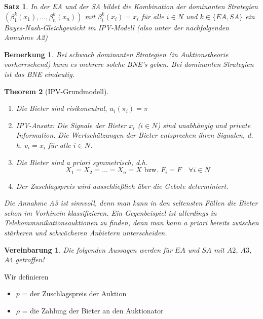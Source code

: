 \documentclass[12pt]{extreport} %
\theoremstyle{named}
\newtheorem{unnamedtheorem}{Theorem} \counterwithin{unnamedtheorem}{chapter}
\theoremstyle{nnamed}
\theoremstyle{itshape}
\newtheorem{satz}[unnamedtheorem]{Satz}
\theoremstyle{normal}
\newtheorem*{bemerkung}{Bemerkung}
\newtheorem*{vereinbarung}{Vereinbarung}
\begin{document}
\begin{satz}
	In der EA und der SA bildet die Kombination der dominanten Strategien $\left(\beta_{1}^{k}(x_{1}), \dotsc, \beta_{n}^{k}(x_{n}) \right)$ mit $\beta_{i}^{k}(x_{i}) = x_{i}$ für alle $i \in N$ und $k \in \{ EA, SA \}$ ein Bayes-Nash-Gleichgewicht im IPV-Modell (also unter der nachfolgenden Annahme A2)
\end{satz}

\begin{bemerkung}
	Bei schwach dominanten Strategien (in Auktionstheorie vorherrschend) kann es mehrere solche BNE's geben. Bei dominanten Strategien ist das BNE eindeutig.	
\end{bemerkung}

  
\begin{unnamedtheorem}[IPV-Grundmodell] ~\
	\begin{enumerate}
		\item[\hspace{0.5cm}A1:] Die Bieter sind risikoneutral, $u_{i}(\pi_{i}) = \pi$
		\item[\hspace{0.5cm}A2:] IPV-Ansatz: Die Signale der Bieter $x_i$ ($i \in N$) sind unabhängig und private Information. Die Wertschätzungen der Bieter entsprechen ihren Signalen, d. h. $v_i = x_i$ für alle $i \in N$.
		\item[\hspace{0.5cm}A3:] Die Bieter sind a priori symmetrisch, d.h.$$ X_{1} = X_{2} = \dotsc = X_{n} = X \text{ bzw. } F_{i} = F \quad \forall i \in N $$
		\item[\hspace{0.5cm}A4:] Der Zuschlagspreis wird ausschließlich über die Gebote determiniert.
	\end{enumerate}
	Die Annahme A3 ist sinnvoll, denn man kann in den seltensten Fällen die Bieter schon im Vorhinein klassifizieren. Ein Gegenbeispiel ist allerdings in Telekommunikationsauktionen zu finden, denn man kann a priori bereits zwischen stärkeren und schwächeren Anbietern unterscheiden.
\end{unnamedtheorem}

\begin{vereinbarung}
	Die folgenden Aussagen werden für $EA$ und $SA$ mit $A2$, $A3$, $A4$ getroffen!
\end{vereinbarung}

Wir definieren
\begin{itemize}
	\item $p$ = der Zuschlagspreis der Auktion
	\item $\rho$ = die Zahlung der Bieter an den Auktionator
\end{itemize}
\end{document}
